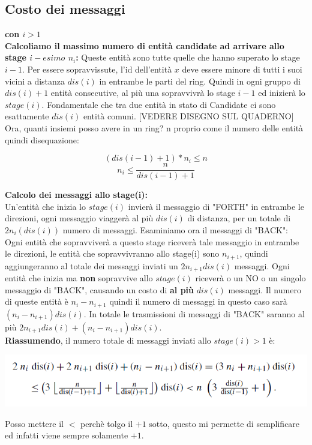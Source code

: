 \subsection{Costo dei messaggi}
\textbf{con $i>1$}\\
\textbf{Calcoliamo il massimo numero di entità candidate ad arrivare allo stage $i-esimo$ $n_i$:}
Queste entità sono tutte quelle che hanno superato lo stage $i-1$. Per essere sopravvissute, l'id dell'entità $x$ deve essere minore di tutti i suoi vicini a distanza $dis(i)$ in entrambe le parti del ring. Quindi in ogni gruppo di $dis(i) + 1$ entità consecutive, al più una sopravvivrà lo stage $i-1$ ed inizierà lo $stage(i)$. Fondamentale che tra due entità in stato di Candidate ci sono esattamente $dis(i)$ entità comuni. [VEDERE DISEGNO SUL QUADERNO] \\
Ora, quanti insiemi posso avere in un ring? n proprio come il numero delle entità quindi disequazione:

$$(dis(i-1)+1) * n_i \leq n$$
$$n_i \leq \frac{n}{dis(i-1) + 1}$$

\textbf{Calcolo dei messaggi allo stage(i):}\\
Un'entità che inizia lo $stage(i)$ invierà il messaggio di "FORTH" in entrambe le direzioni, ogni messaggio viaggerà al più $dis(i)$ di distanza, per un totale di $2n_i(dis(i))$ numero di messaggi. Esaminiamo ora il messaggi di "BACK": Ogni entità che sopravviverà a questo stage riceverà tale messaggio in entrambe le direzioni, le entità che sopravvivranno allo stage(i) sono $n_{i+1}$, quindi aggiungeranno al totale dei messaggi inviati un $2n_{i+1}dis(i)$ messaggi. Ogni entità che inizia ma \textbf{non} sopravvive allo $stage(i)$ riceverà o un NO o un singolo messaggio di "BACK", causando un costo di \textbf{al più} $dis(i)$ messaggi. Il numero di queste entità è $n_i - n_{i+1}$ quindi il numero di messaggi in questo caso sarà  $(n_i - n_{i+1})dis(i)$. In totale le trasmissioni di messaggi di "BACK" saranno al più $2n_{i+1}dis(i) + (n_i - n_{i+1})dis(i)$.\\
\textbf{Riassumendo}, il numero totale di messaggi inviati allo $stage(i) > 1$ è:
\begin{center}
    \includegraphics[scale=0.6]{aa/bb.png}
\end{center}
Posso mettere il $<$ perchè tolgo il $+1$ sotto, questo mi permette di semplificare ed infatti viene sempre solamente $+1$.


